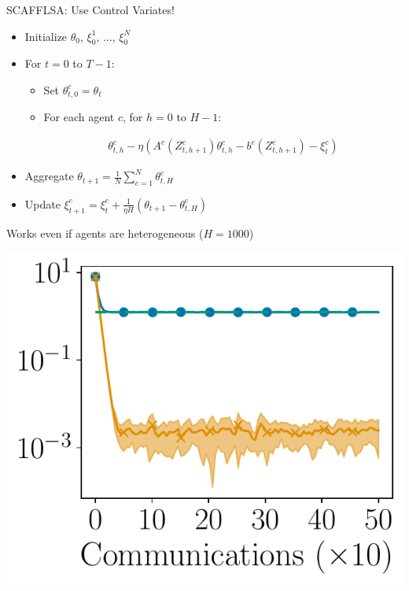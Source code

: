 \documentclass[17pt,aspectratio=169]{beamer}
\begin{document}
\begin{frame}
  { \Large SCAFFLSA: Use Control Variates! }
  \begin{itemize}
  \item Initialize $\theta_0$, $\xi_0^1$, $\dots$, $\xi_0^N$
  \item For $t = 0$ to $T-1$:
    \begin{itemize}
    \item Set $\theta_{t,0}^c = \theta_{t}$
    \item For each agent $c$, for $h=0$ to $H-1$:

      \vspace{-1em}
      
      
      \begin{align*}
        \theta_{t,h}^c - \eta ( A^c(Z_{t,h+1}^c) \theta_{t,h}^c - b^c(Z_{t,h+1}^c) - \xi_t^c)
      \end{align*}

      \vspace{0.5em}

    \end{itemize}
    \item Aggregate $\theta_{t+1} = \frac{1}{N} \sum_{c=1}^N \theta_{t,H}^c$
    \item Update $\xi^c_{t+1} = \xi_t^c + \frac{1}{\eta H} ( \theta_{t+1} - \theta_{t,H}^c )$
  \end{itemize}  
\end{frame}

\begin{frame}
  Works even if agents are heterogeneous ($H=1000$)

  \begin{center}
    \includegraphics[width=0.4\linewidth]{plots/plot_hg_scafflsa.pdf}
  \end{center}

\end{frame}
\end{document}
